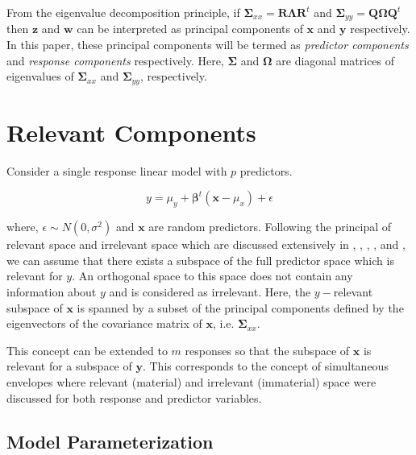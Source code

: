 \documentclass[3p,times,12pt,authoryear]{elsarticle}
\theoremstyle{definition}
\theoremstyle{definition}
\theoremstyle{remark}
\begin{document}
From the eigenvalue decomposition principle, if
\(\boldsymbol{\Sigma}_{xx} = \mathbf{R}\boldsymbol{\Lambda}\mathbf{R}^t\)
and
\(\boldsymbol{\Sigma}_{yy} = \mathbf{Q}\boldsymbol{\Omega}\mathbf{Q}^t\)
then \(\mathbf{z}\) and \(\mathbf{w}\) can be interpreted as principal
components of \(\mathbf{x}\) and \(\mathbf{y}\) respectively. In this
paper, these principal components will be termed as \emph{predictor
components} and \emph{response components} respectively. Here,
\(\boldsymbol{\Sigma}\) and \(\boldsymbol{\Omega}\) are diagonal
matrices of eigenvalues of \(\boldsymbol{\Sigma}_{xx}\) and
\(\boldsymbol{\Sigma}_{yy}\), respectively.

\section{Relevant Components}\label{relevant-components}

Consider a single response linear model with \(p\) predictors.

\[y = \mu_y + \boldsymbol{\beta}^t\left(\mathbf{x} - \mu_x\right) + \epsilon\]

where, \(\epsilon \sim N(0, \sigma^2)\) and \(\mathbf{x}\) are random
predictors. Following the principal of relevant space and irrelevant
space which are discussed extensively in \citet{helland1994comparison},
\citet{Helland2000}, \citet{helland2012near}, \citet{cook2013envelopes},
\citet{saebo2015simrel} and \citet{helland2017}, we can assume that
there exists a subspace of the full predictor space which is relevant
for \(y\). An orthogonal space to this space does not contain any
information about \(y\) and is considered as irrelevant. Here, the
\(y-\)relevant subspace of \(\mathbf{x}\) is spanned by a subset of the
principal components defined by the eigenvectors of the covariance
matrix of \(\mathbf{x}\), i.e. \(\boldsymbol{\Sigma}_{xx}\).

This concept can be extended to \(m\) responses so that the subspace of
\(\mathbf{x}\) is relevant for a subspace of \(\mathbf{y}\). This
corresponds to the concept of simultaneous envelopes
\citep{cook2015simultaneous} where relevant (material) and irrelevant
(immaterial) space were discussed for both response and predictor
variables.

\subsection{Model Parameterization}\label{model-parameterization}
\end{document}
